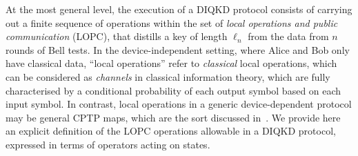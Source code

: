 \documentclass[10pt, a4paper]{article}
\numberwithin{equation}{section} %
\theoremstyle{definition}
\theoremstyle{plain}
\newcommand{\?}{\mathrel{?}} %
\begin{document}
    At the most general level, the execution of a DIQKD protocol consists of carrying out a finite sequence of operations within the set of \emph{local operations and public communication} (LOPC), that distills a key of length \(\ell_n\) from the data from \(n\) rounds of Bell tests. In the device-independent setting, where Alice and Bob only have classical data, ``local operations'' refer to \emph{classical} local operations, which can be considered as \emph{channels} in classical information theory, which are fully characterised by a conditional probability of each output symbol based on each input symbol. In contrast, local operations in a generic device-dependent protocol may be general CPTP maps, which are the sort discussed in~\cite{CQKeyDistill}. We provide here an explicit definition of the LOPC operations allowable in a DIQKD protocol, expressed in terms of operators acting on states.
\end{document}
